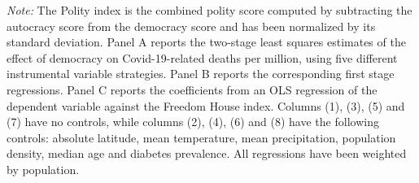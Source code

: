 {\begin{table}[]
\begin{threeparttable}
\begin{tablenotes}
\item {\footnotesize {\textit{Note:} The Polity index is the combined polity score computed by subtracting the autocracy score from the democracy score and has been normalized by its standard deviation. Panel A reports the two-stage least squares estimates of the effect of democracy on Covid-19-related deaths per million, using five different instrumental variable strategies. Panel B reports the corresponding first stage regressions. Panel C reports the coefficients from an OLS regression of the dependent variable against the Freedom House index.  Columns (1), (3), (5) and (7) have no controls, while columns (2), (4), (6) and (8) have the following controls: absolute latitude, mean temperature, mean precipitation, population density, median age and diabetes prevalence. All regressions have been weighted by population.}}
\end{tablenotes}
\end{threeparttable}
\end{table} 


\clearpage
{}
\recalctypearea
}


